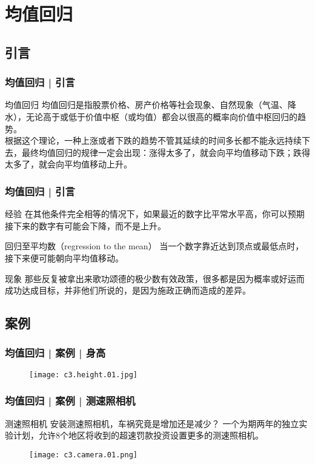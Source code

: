 \section{均值回归}
\subsection{引言}
\begin{frame}
  \frametitle{均值回归 | 引言}
  \begin{block}{均值回归}
    均值回归是指股票价格、房产价格等社会现象、自然现象（气温、降水），无论高于或低于价值中枢（或均值）都会以很高的概率向价值中枢回归的趋势。\\
    \vspace{1em}
根据这个理论，一种上涨或者下跌的趋势不管其延续的时间多长都不能永远持续下去，最终均值回归的规律一定会出现：涨得太多了，就会向平均值移动下跌；跌得太多了，就会向平均值移动上升。
  \end{block}
\end{frame}

\begin{frame}
  \frametitle{均值回归 | 引言}
  \begin{block}{经验}
    在其他条件完全相等的情况下，如果最近的数字比平常水平高，你可以预期接下来的数字有可能会下降，而不是上升。
  \end{block}
  \pause
  \begin{block}{回归至平均数（regression to the mean）}
    当一个数字靠近达到顶点或最低点时，接下来便可能朝向平均值移动。
  \end{block}
  \pause
  \begin{block}{现象}
    那些反复被拿出来歌功颂德的极少数有效政策，很多都是因为概率或好运而成功达成目标，并非他们所说的，是因为施政正确而造成的差异。
  \end{block}
\end{frame}

\subsection{案例}
\begin{frame}
  \frametitle{均值回归 | 案例 | 身高}
  \begin{figure}
    \centering
    \texttt{[image: c3.height.01.jpg]}
  \end{figure}
\end{frame}

\begin{frame}
  \frametitle{均值回归 | 案例 | 测速照相机}
  \begin{block}{测速照相机}
    安装测速照相机，车祸究竟是增加还是减少？
    一个为期两年的独立实验计划，允许8个地区将收到的超速罚款投资设置更多的测速照相机。
  \end{block}
  \begin{figure}
    \centering
    \texttt{[image: c3.camera.01.png]}
  \end{figure}
\end{frame}

